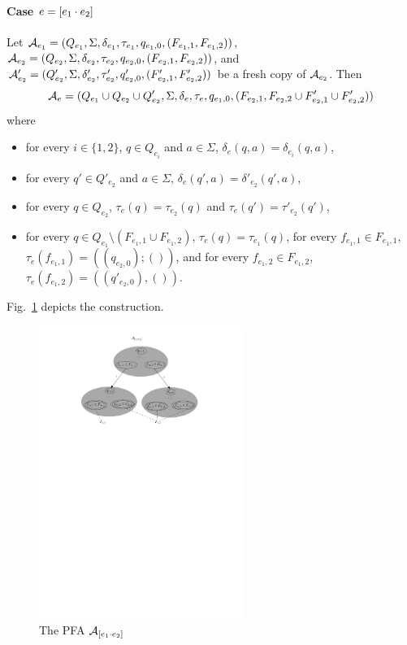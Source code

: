 \paragraph{Case $e = [e_1 \cdot e_2]$} 
Let $\mathcal{A}_{e_1} = (Q_{e_1}, \Sigma, \delta_{e_1}, \tau_{e_1}, q_{e_1,0}, (F_{e_1,1}, F_{e_1,2}))$, $\mathcal{A}_{e_2} = (Q_{e_2}, \Sigma, \delta_{e_2}, \tau_{e_2}, q_{e_2,0}, (F_{e_2, 1}, F_{e_2,2}))$, and $\mathcal{A}'_{e_2} = (Q'_{e_2}, \Sigma, \delta'_{e_2}, \tau'_{e_2}, q'_{e_2,0}, (F'_{e_2, 1}, F'_{e_2,2}))$ be a fresh copy of $\mathcal{A}_{e_2}$. Then 
%
\[\mathcal{A}_e = ( Q_{e_1} \cup Q_{e_2} \cup Q'_{e_2}, \Sigma, \delta_e, \tau_e, q_{e_1,0}, (F_{e_2,1}, F_{e_2,2} \cup F'_{e_2,1} \cup F'_{e_2,2}))\] where 
	\begin{itemize}
	 \item for every $i \in \{1,2\}$, $q \in Q_{e_i}$ and $a \in \Sigma$, $\delta_e(q, a) = \delta_{e_i}(q, a)$,
	\item for every $q' \in Q'_{e_2}$ and $a \in \Sigma$, $\delta_e(q', a) = \delta'_{e_2}(q',a)$, 
	\item for every $q \in Q_{e_2}$, $\tau_e(q) = \tau_{e_2}(q)$ and $\tau_e(q') = \tau'_{e_2}(q')$, 
	\item for every $q \in Q_{e_1} \setminus (F_{e_1,1} \cup F_{e_1,2})$, $\tau_e(q) = \tau_{e_1}(q)$, for every $f_{e_1,1} \in F_{e_1,1}$, $\tau_e(f_{e_1,1}) = ((q_{e_2,0}); ())$, and for every $f_{e_1,2} \in F_{e_1,2}$, $\tau_e(f_{e_1,2}) = ((q'_{e_2,0}), ())$.
  \end{itemize}
 Fig.~\ref{fig-reg2pfa-2} depicts the construction. 
		\begin{figure}[ht]
			\centering
			\includegraphics[width = 0.6\textwidth]{reg2pfa-2.pdf}
			\caption{The PFA $\mathcal{A}_{[e_1\cdot e_2]}$}
			\label{fig-reg2pfa-2}
		\end{figure}  
	

